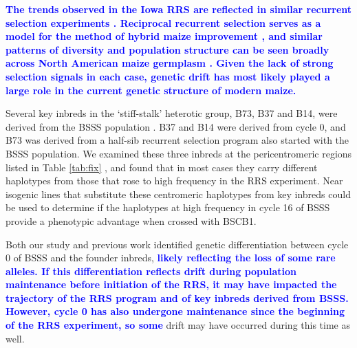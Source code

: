 \documentclass[twocolumn,twoside,letterpaper]{article}
\newcommand{\jri}[1]{\todo[size=\scriptsize, color=flame]{#1}}
\newcommand{\rev}[1]{\textcolor{blue}{\bf #1}}
\begin{document}
\rev{The trends observed in the Iowa RRS are reflected in similar recurrent selection experiments \citep{romay2012effect,lamkey2014relative}.
Reciprocal recurrent selection serves as a model for the method of hybrid maize improvement \citep{duvick2004long}, and similar patterns of diversity and population structure can be seen broadly across North American maize germplasm \citep{van2012historical}. 
Given the lack of strong selection signals in each case, genetic drift has most likely played a large role in the current genetic structure of modern maize. }	
	
Several key inbreds in the ‘stiff-stalk’ heterotic group, B73, B37 and B14, were derived from the BSSS population \citep{darrah1986, troyer1999background}. 
B37 and B14 were derived from cycle 0, and B73 was derived from a half-sib recurrent selection program also started with the BSSS population. 
We examined these three inbreds at the pericentromeric regions listed in Table \ref{tab:fix} \jri{correct?}, and found that in most cases they carry different haplotypes from those that rose to high frequency in the RRS experiment.  
Near isogenic lines that substitute these centromeric haplotypes from key inbreds could be used to determine if the haplotypes at high frequency in cycle 16 of BSSS provide a phenotypic advantage when crossed with BSCB1. 

Both our study and previous work \citep{labate1997molecular} identified genetic differentiation between cycle 0 of BSSS and the founder inbreds, \rev{likely reflecting the loss of some rare alleles.
If this differentiation reflects drift during population maintenance before initiation of the RRS, it may have impacted the trajectory of the RRS program and of key inbreds derived from BSSS. 
However, cycle 0 has also undergone maintenance since the beginning of the RRS experiment, so some} drift may have occurred during this time as well.
	
\end{document}
